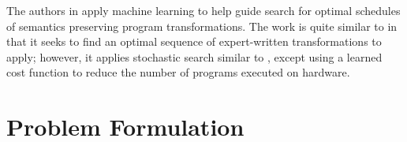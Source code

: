\documentclass{article}
\begin{document}
The authors in \cite{chen2018learning} apply machine learning to help guide search for optimal schedules of semantics preserving program transformations. The work is quite similar to \cite{chen2019learning} in that it seeks to find an optimal sequence of expert-written transformations to apply; however, it applies stochastic search similar to \cite{schkufza2013stochastic}, except using a learned cost function to reduce the number of programs executed on hardware. 




\section{Problem Formulation}





\end{document}
